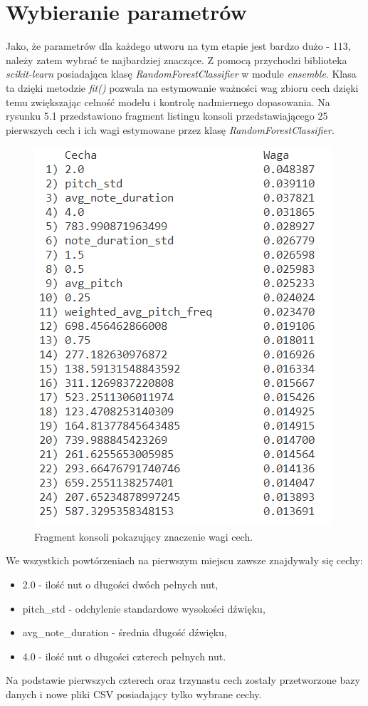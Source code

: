 \documentclass[printmode, eng]{mgr}
\newcommand\tab[1][1cm]{\hspace*{#1}}
\begin{document}
\section{Wybieranie parametrów}
\tab Jako, że parametrów dla każdego utworu na tym etapie jest bardzo dużo -  113, należy zatem wybrać te najbardziej znaczące. Z pomocą przychodzi biblioteka \textit{scikit-learn} posiadająca klasę \textit{RandomForestClassifier} w module \textit{ensemble}. Klasa ta dzięki metodzie \textit{fit()} pozwala na estymowanie ważności wag zbioru cech dzięki temu zwiększając celność modelu i kontrolę nadmiernego dopasowania. Na rysunku 5.1 przedstawiono fragment listingu konsoli przedstawiającego 25 pierwszych cech i ich wagi estymowane przez klasę \textit{RandomForestClassifier}.\\
\begin{figure}[!htb]
\centering
\includegraphics{wagi}
\caption{Fragment konsoli pokazujący znaczenie wagi cech.}
\end{figure}
\tab We wszystkich powtórzeniach na pierwszym miejscu zawsze znajdywały się cechy: 
\begin{itemize}
\item 2.0 - ilość nut o długości dwóch pełnych nut,
\item pitch\_std - odchylenie standardowe wysokości dźwięku,
\item avg\_note\_duration - średnia długość dźwięku,
\item 4.0 - ilość nut o długości czterech pełnych nut.
\end{itemize}
\tab Na podstawie pierwszych czterech oraz trzynastu cech zostały przetworzone bazy danych i nowe pliki CSV posiadający tylko wybrane cechy.\newpage
\end{document}
